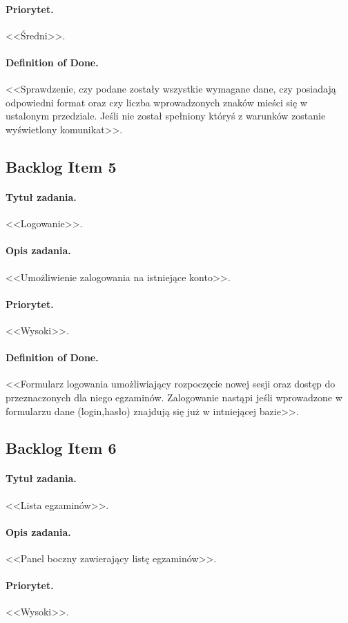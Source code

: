 \documentclass[a4paper]{article}
\begin{document}
\paragraph{Priorytet.} <<Średni>>.
\paragraph{Definition of Done.} <<Sprawdzenie, czy podane zostały wszystkie wymagane dane, czy posiadają odpowiedni format oraz czy liczba wprowadzonych znaków mieści się w ustalonym przedziale. Jeśli nie został spełniony któryś z warunków zostanie wyświetlony komunikat>>.

\subsection{Backlog Item 5}
\paragraph{Tytuł zadania.} <<Logowanie>>.
\paragraph{Opis zadania.} <<Umożliwienie zalogowania na istniejące konto>>.
\paragraph{Priorytet.} <<Wysoki>>.
\paragraph{Definition of Done.} <<Formularz logowania umożliwiający rozpoczęcie nowej sesji oraz dostęp do przeznaczonych dla niego egzaminów. Zalogowanie nastąpi jeśli wprowadzone w formularzu dane (login,hasło) znajdują się już w intniejącej bazie>>.

\subsection{Backlog Item 6}
\paragraph{Tytuł zadania.} <<Lista egzaminów>>.
\paragraph{Opis zadania.} <<Panel boczny zawierający listę egzaminów>>.
\paragraph{Priorytet.} <<Wysoki>>.
\end{document}
